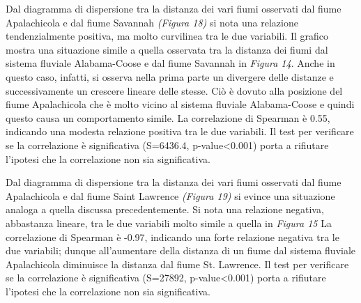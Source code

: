 \documentclass{article} %
\begin{document}
Dal diagramma di dispersione tra la distanza dei vari fiumi osservati dal fiume Apalachicola e dal fiume Savannah \textit{(Figura 18)} si nota una relazione tendenzialmente positiva, ma molto curvilinea tra le due variabili. 
Il grafico mostra una situazione simile a quella osservata tra la distanza dei fiumi dal sistema fluviale Alabama-Coose e dal fiume Savannah in \textit{Figura 14}. Anche in questo caso, infatti, si osserva nella prima parte un divergere delle distanze e successivamente un crescere lineare delle stesse. 
Ciò è dovuto alla posizione del fiume Apalachicola che è molto vicino al sistema fluviale Alabama-Coose e quindi questo causa un comportamento simile.
La correlazione di Spearman è 0.55, indicando una modesta relazione positiva tra le due variabili.  
Il test per verificare se la correlazione è significativa (S=6436.4, p-value<0.001) porta a rifiutare l'ipotesi che la correlazione non sia significativa.

Dal diagramma di dispersione tra la distanza dei vari fiumi osservati dal fiume Apalachicola e dal fiume Saint Lawrence \textit{(Figura 19)} si evince una situazione analoga a quella discussa precedentemente.
Si nota una relazione negativa, abbastanza lineare, tra le due variabili molto simile a quella in \textit{Figura 15}
La correlazione di Spearman è -0.97, indicando una forte relazione negativa tra le due variabili; dunque all'aumentare della distanza di un fiume dal sistema fluviale Apalachicola diminuisce la distanza dal fiume St. Lawrence. 
Il test per verificare se la correlazione è significativa (S=27892, p-value<0.001) porta a rifiutare l'ipotesi che la correlazione non sia significativa.
\end{document}
